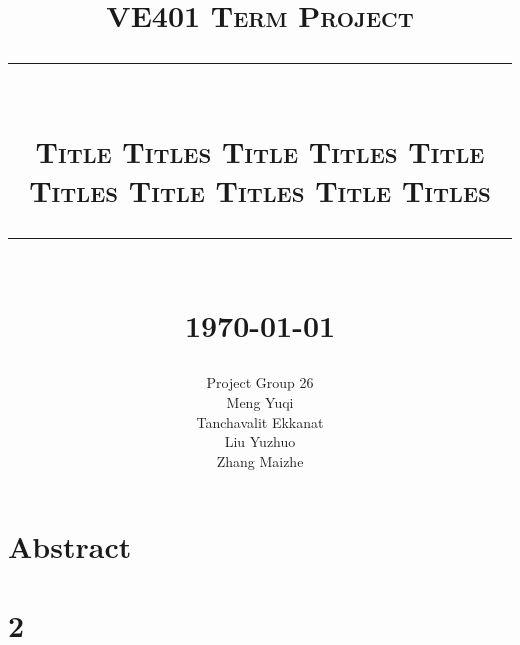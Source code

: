 \documentclass[12pt]{article}
\newcommand{\HRule}[1]{\rule{\linewidth}{#1}}
\begin{document}
\title{ \normalsize \textsc{VE401 Term Project}
		\\ [3.0cm]
		\HRule{0.5pt} \\ [0.5pt]
        \vspace*{\baselineskip}
		\LARGE \textbf{\textsc{Title Titles Title Titles Title Titles Title Titles Title Titles}}
		\HRule{2pt} \\ [0.5cm]
        \vspace*{\baselineskip}
		\normalsize \today \vspace*{5\baselineskip}}

\date{}

\author{ \normalsize
		\normalsize Project Group 26 \\ 
        \normalsize Meng Yuqi \\
		\normalsize Tanchavalit Ekkanat \\
        \normalsize Liu Yuzhuo \\ 
        \normalsize Zhang Maizhe}

\maketitle
\thispagestyle{empty}
\newpage
\thispagestyle{empty}

\doublespacing
\tableofcontents
\newpage
\singlespacing
{}

\section{Abstract}

\section{2}
\end{document}
